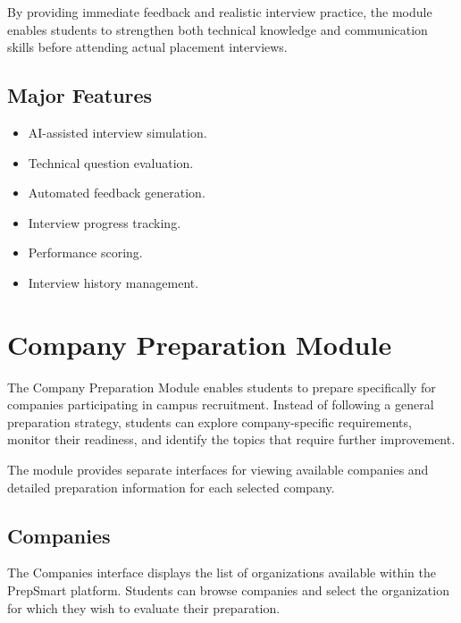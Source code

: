 By providing immediate feedback and realistic interview practice, the module enables students to strengthen both technical knowledge and communication skills before attending actual placement interviews.

\subsection*{Major Features}

\begin{itemize}

\item AI-assisted interview simulation.

\item Technical question evaluation.

\item Automated feedback generation.

\item Interview progress tracking.

\item Performance scoring.

\item Interview history management.

\end{itemize}

\section{Company Preparation Module}

The Company Preparation Module enables students to prepare specifically for companies participating in campus recruitment. Instead of following a general preparation strategy, students can explore company-specific requirements, monitor their readiness, and identify the topics that require further improvement.

The module provides separate interfaces for viewing available companies and detailed preparation information for each selected company.

\subsection{Companies}

The Companies interface displays the list of organizations available within the PrepSmart platform. Students can browse companies and select the organization for which they wish to evaluate their preparation.

